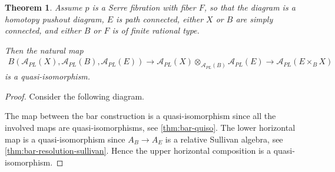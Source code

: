 \documentclass{scrartcl}
\theoremstyle{plain}
\newtheorem{theorem}{Theorem}[section]
\theoremstyle{definition}
\newcommand{\Apl}{\mathcal A_{PL}}
\newcommand{\from}{\leftarrow}
\begin{document}
\begin{theorem}\label{thm:pullback-pushout}
Assume $p$ is a Serre fibration with fiber $F$, so that the diagram is a homotopy pushout diagram, $E$ is path connected, either $X$ or $B$ are simply connected, and either $B$ or $F$ is of finite rational type. 

Then the natural map
\begin{align*}
    B(\Apl(X),\Apl(B), \Apl(E)) \to \Apl(X) \otimes_{\Apl(B) }\Apl(E) \to \Apl(E\times_B X)
\end{align*}
is a quasi-isomorphism. 
\end{theorem}
\begin{proof}
    Consider the following diagram.
    \begin{center}
    \end{center}
    The map between the bar construction is a quasi-isomorphism since all the involved maps are quasi-isomorphisms, see \ref{thm:bar-quiso}. The lower horizontal map is a quasi-isomorphism since $A_B\to A_E$ is a relative Sullivan algebra, see \ref{thm:bar-resolution-sullivan}. Hence the upper horizontal composition is a quasi-isomorphism.
\end{proof}
\end{document}

